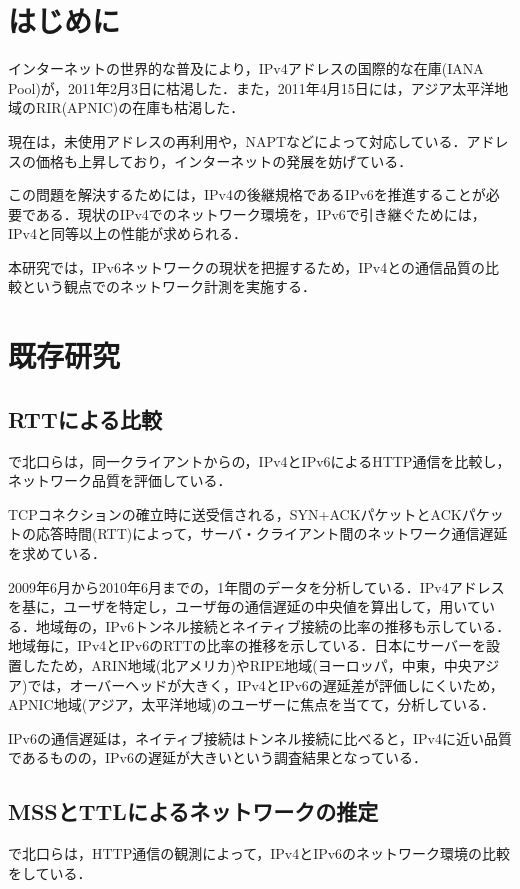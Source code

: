 \documentclass[rinkou,a4paper]{ieicej}
\begin{document}
\maketitle

\section{はじめに}
インターネットの世界的な普及により，IPv4アドレスの国際的な在庫(IANA Pool)が，2011年2月3日に枯渇した．また，2011年4月15日には，アジア太平洋地域のRIR(APNIC)の在庫も枯渇した．

現在は，未使用アドレスの再利用や，NAPTなどによって対応している．アドレスの価格も上昇しており，インターネットの発展を妨げている．

この問題を解決するためには，IPv4の後継規格であるIPv6を推進することが必要である．現状のIPv4でのネットワーク環境を，IPv6で引き継ぐためには，IPv4と同等以上の性能が求められる．

本研究では，IPv6ネットワークの現状を把握するため，IPv4との通信品質の比較という観点でのネットワーク計測を実施する．

\section{既存研究}
\subsection{RTTによる比較}
\cite{kitaguchi1}で北口らは，同一クライアントからの，IPv4とIPv6によるHTTP通信を比較し，ネットワーク品質を評価している．

TCPコネクションの確立時に送受信される，SYN+ACKパケットとACKパケットの応答時間(RTT)によって，サーバ・クライアント間のネットワーク通信遅延を求めている．

2009年6月から2010年6月までの，1年間のデータを分析している．IPv4アドレスを基に，ユーザを特定し，ユーザ毎の通信遅延の中央値を算出して，用いている．地域毎の，IPv6トンネル接続とネイティブ接続の比率の推移も示している．地域毎に，IPv4とIPv6のRTTの比率の推移を示している．日本にサーバーを設置したため，ARIN地域(北アメリカ)やRIPE地域(ヨーロッパ，中東，中央アジア)では，オーバーヘッドが大きく，IPv4とIPv6の遅延差が評価しにくいため，APNIC地域(アジア，太平洋地域)のユーザーに焦点を当てて，分析している．

IPv6の通信遅延は，ネイティブ接続はトンネル接続に比べると，IPv4に近い品質であるものの，IPv6の遅延が大きいという調査結果となっている．

\subsection{MSSとTTLによるネットワークの推定}
\cite{kitaguchi2}で北口らは，HTTP通信の観測によって，IPv4とIPv6のネットワーク環境の比較をしている．
\end{document}
